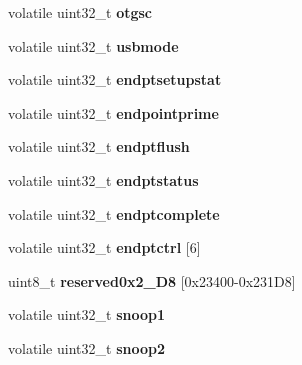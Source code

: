 \begin{DoxyCompactItemize}
volatile uint32\+\_\+t {\bfseries otgsc}
\item 
\mbox{\label{structm83xxUSB__DRRegisters___a32689a81acf86a00a519c2e501265df4}} 
volatile uint32\+\_\+t {\bfseries usbmode}
\item 
\mbox{\label{structm83xxUSB__DRRegisters___ae7c7e72a10470817cb8aaff8a2ae05e9}} 
volatile uint32\+\_\+t {\bfseries endptsetupstat}
\item 
\mbox{\label{structm83xxUSB__DRRegisters___a9b9ad344de3cd7b9c05f93c7c76677c7}} 
volatile uint32\+\_\+t {\bfseries endpointprime}
\item 
\mbox{\label{structm83xxUSB__DRRegisters___afb538201b9ae813826bc2940bb665b1e}} 
volatile uint32\+\_\+t {\bfseries endptflush}
\item 
\mbox{\label{structm83xxUSB__DRRegisters___a8b4cd83b47664a3b996fbb2109879d59}} 
volatile uint32\+\_\+t {\bfseries endptstatus}
\item 
\mbox{\label{structm83xxUSB__DRRegisters___ab29bd270ca004b673f276de0353b27c9}} 
volatile uint32\+\_\+t {\bfseries endptcomplete}
\item 
\mbox{\label{structm83xxUSB__DRRegisters___a1571b538121155c57dceac8d45a2156e}} 
volatile uint32\+\_\+t {\bfseries endptctrl} \mbox{[}6\mbox{]}
\item 
\mbox{\label{structm83xxUSB__DRRegisters___ace5972d8987f2e11474a0f86b499e131}} 
uint8\+\_\+t {\bfseries reserved0x2\+\_\+D8} \mbox{[}0x23400-\/0x231\+D8\mbox{]}
\item 
\mbox{\label{structm83xxUSB__DRRegisters___adde7f4302ac2c25854e6779a8d846316}} 
volatile uint32\+\_\+t {\bfseries snoop1}
\item 
\mbox{\label{structm83xxUSB__DRRegisters___a5bac008abf6625d20d8f55a063124582}} 
volatile uint32\+\_\+t {\bfseries snoop2}
\item 

\end{DoxyCompactItemize}
